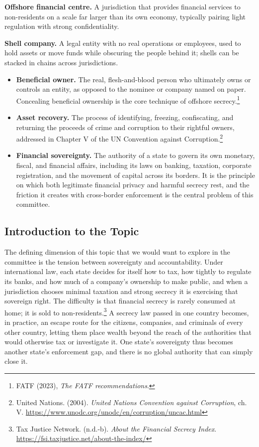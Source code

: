 \textbf{Offshore financial centre.} A jurisdiction that provides financial services to non-residents on a scale far larger than its own economy, typically pairing light regulation with strong confidentiality.

\textbf{Shell company.} A legal entity with no real operations or employees, used to hold assets or move funds while obscuring the people behind it; shells can be stacked in chains across jurisdictions.

\begin{itemize}
  \item \textbf{Beneficial owner.} The real, flesh-and-blood person who ultimately owns or controls an entity, as opposed to the nominee or company named on paper. Concealing beneficial ownership is the core technique of offshore secrecy.\footnote{FATF (2023), \emph{The FATF recommendations}.}
  \item \textbf{Asset recovery.} The process of identifying, freezing, confiscating, and returning the proceeds of crime and corruption to their rightful owners, addressed in Chapter V of the UN Convention against Corruption.\footnote{United Nations. (2004). \emph{United Nations Convention against Corruption}, ch. V. \url{https://www.unodc.org/unodc/en/corruption/uncac.html}}
  \item \textbf{Financial sovereignty.} The authority of a state to govern its own monetary, fiscal, and financial affairs, including its laws on banking, taxation, corporate registration, and the movement of capital across its borders. It is the principle on which both legitimate financial privacy and harmful secrecy rest, and the friction it creates with cross-border enforcement is the central problem of this committee.
\end{itemize}

\subsection{Introduction to the Topic}

The defining dimension of this topic that we would want to explore in the committee is the tension between sovereignty and accountability. Under international law, each state decides for itself how to tax, how tightly to regulate its banks, and how much of a company’s ownership to make public, and when a jurisdiction chooses minimal taxation and strong secrecy it is exercising that sovereign right. The difficulty is that financial secrecy is rarely consumed at home; it is sold to non-residents.\footnote{Tax Justice Network. (n.d.-b). \emph{About the Financial Secrecy Index}. \url{https://fsi.taxjustice.net/about-the-index/}} A secrecy law passed in one country becomes, in practice, an escape route for the citizens, companies, and criminals of every other country, letting them place wealth beyond the reach of the authorities that would otherwise tax or investigate it. One state’s sovereignty thus becomes another state’s enforcement gap, and there is no global authority that can simply close it.

